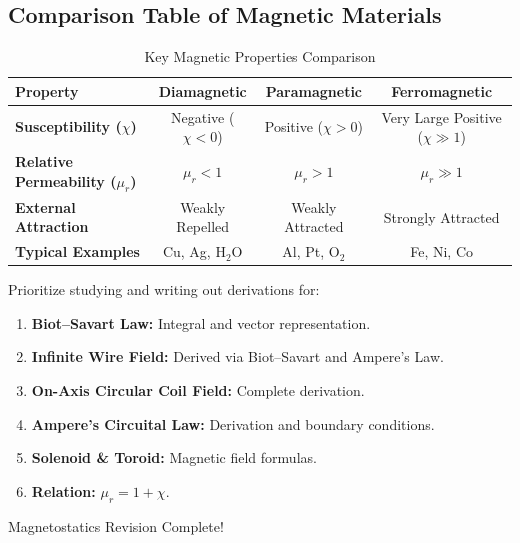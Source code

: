 \documentclass[11pt,a4paper]{article}
\begin{document}
\subsection{Comparison Table of Magnetic Materials}
\begin{table}[htbp]
    \centering
    \caption{Key Magnetic Properties Comparison}
    \vspace{0.2cm}
    \begin{tabular}{lccc}
        \toprule
        \textbf{Property} & \textbf{Diamagnetic} & \textbf{Paramagnetic} & \textbf{Ferromagnetic} \\
        \midrule
        \textbf{Susceptibility ($\chi$)} & Negative ($\chi < 0$) & Positive ($\chi > 0$) & Very Large Positive ($\chi \gg 1$) \\
        \textbf{Relative Permeability ($\mu_r$)} & $\mu_r < 1$ & $\mu_r > 1$ & $\mu_r \gg 1$ \\
        \textbf{External Attraction} & Weakly Repelled & Weakly Attracted & Strongly Attracted \\
        \textbf{Typical Examples} & Cu, Ag, H$_2$O & Al, Pt, O$_2$ & Fe, Ni, Co \\
        \bottomrule
    \end{tabular}
\end{table}

\newpage
\begin{prioritybox}
    Prioritize studying and writing out derivations for:
    \begin{enumerate}[label=\textbf{\arabic*.}]
        \item \textbf{Biot--Savart Law:} Integral and vector representation.
        \item \textbf{Infinite Wire Field:} Derived via Biot--Savart and Ampere's Law.
        \item \textbf{On-Axis Circular Coil Field:} Complete derivation.
        \item \textbf{Ampere's Circuital Law:} Derivation and boundary conditions.
        \item \textbf{Solenoid \& Toroid:} Magnetic field formulas.
        \item \textbf{Relation:} $\mu_r = 1 + \chi$.
    \end{enumerate}
\end{prioritybox}

\begin{successbox}
    Magnetostatics Revision Complete! \checkmark
\end{successbox}
\end{document}

